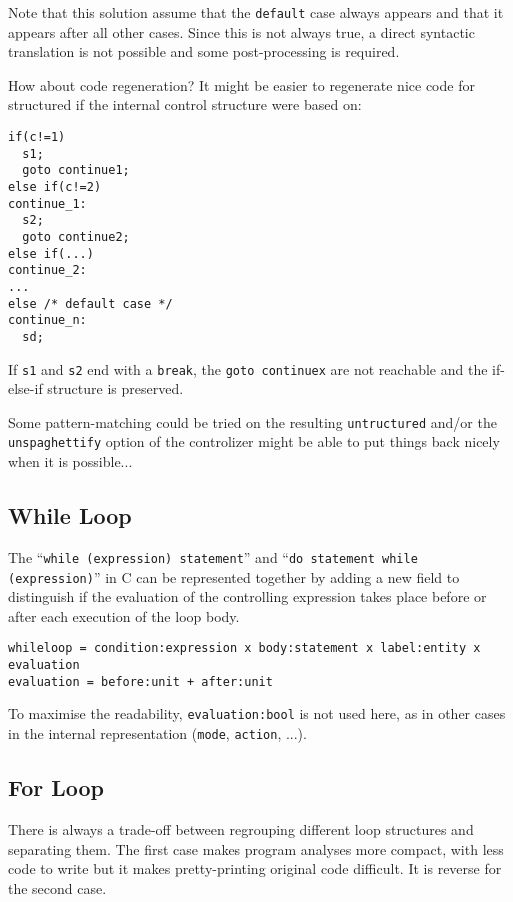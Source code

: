 \documentclass[a4paper]{report}
\begin{document}
Note that this solution assume that the \verb/default/ case always
appears and that it appears after all other cases. Since this is not
always true, a direct syntactic translation is not possible and some
post-processing is required.

How about code regeneration? It might be easier to regenerate nice
code for structured if the internal control structure were based on:

\begin{lstlisting}
if(c!=1) 
  s1;
  goto continue1;
else if(c!=2)
continue_1:
  s2;
  goto continue2;
else if(...)
continue_2:
...
else /* default case */
continue_n:
  sd;
\end{lstlisting}

If \verb/s1/ and \verb/s2/ end with a \verb/break/, the
\verb/goto continuex/ are not reachable and the if-else-if structure
is preserved.

Some pattern-matching could be tried on the resulting
\verb/untructured/ and/or the \verb/unspaghettify/ option of the
controlizer might be able to put things back nicely when it is
possible...

\subsection{While Loop}

The ``\lstinline/while (expression) statement/'' and 
``\lstinline/do statement while (expression)/'' in C can be represented together
 by adding a new field to distinguish
if the evaluation of the
controlling expression takes place before or after each execution of the
loop body.   

\begin{verbatim}
whileloop = condition:expression x body:statement x label:entity x evaluation
evaluation = before:unit + after:unit
\end{verbatim}
To maximise the readability, \verb|evaluation:bool| is not used here,
as in other cases in the internal representation (\verb/mode/,
\verb/action/, ...).

\subsection{For Loop}

There is always a trade-off between regrouping different loop structures
and separating them. The first case makes program analyses more compact,
with less code to write but it makes pretty-printing original code
difficult. It is reverse for the second case. 
\end{document}
